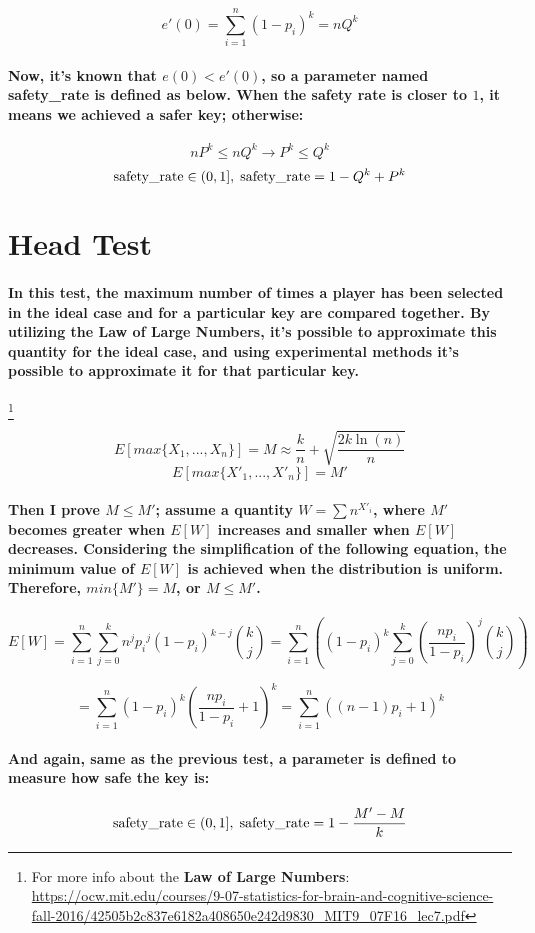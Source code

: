 \documentclass[oneside]{book}
\newcommand{\myparagraph}[1]{\paragraph{\textnormal{#1}}}
\begin{document}
$$e'(0) = \sum_{i=1}^{n} (1 - p_i)^k = n Q^k$$

\myparagraph{
Now, it's known that $e(0) < e'(0)$, so a parameter named safety\_rate is defined as below. When the safety rate is closer to $1$, it means we achieved a safer key; otherwise:
}

$$nP^k \le nQ^k \rightarrow P^k \le Q^k$$
$$\textnormal{safety\_rate} \in (0, 1], \; \textnormal{safety\_rate} = 1-Q^k+P^k$$

\section{Head Test}

\myparagraph{
In this test, the maximum number of times a player has been selected in the ideal case and for a particular key are compared together. By utilizing the \textbf{Law of Large Numbers}, it's possible to approximate this quantity for the ideal case, and using experimental methods it's possible to approximate it for that particular key.
}
\footnote{
For more info about the \textbf{Law of Large Numbers}:\newline
\href{https://ocw.mit.edu/courses/9-07-statistics-for-brain-and-cognitive-science-fall-2016/42505b2c837e6182a408650e242d9830_MIT9_07F16_lec7.pdf}{https://ocw.mit.edu/courses/9-07-statistics-for-brain-and-cognitive-science-fall-2016/42505b2c837e6182a408650e242d9830\_MIT9\_07F16\_lec7.pdf}
}

$$E[max\{X_1, ..., X_n\}] = M \approx  \frac{k}{n} + \sqrt{\frac{2k \ln(n)}{n}}$$
$$E[max\{X'_1, ..., X'_n\}] = M'$$

\myparagraph{
Then I prove $M \le M'$; assume a quantity $W=\sum n^{X'_i}$, where $M'$ becomes greater when $E[W]$ increases and smaller when $E[W]$ decreases. Considering the simplification of the following equation, the minimum value of $E[W]$ is achieved when the distribution is uniform. Therefore, $min\{M'\}=M$, or $M \le M'$.
}

$$E[W] = \sum_{i=1}^n \sum_{j=0}^k n^j {p_i}^j (1-p_i)^{k-j} \binom{k}{j} = \sum_{i=1}^n \left( (1-p_i)^k \sum_{j=0}^k \left( \frac{np_i}{1-p_i} \right)^j \binom{k}{j} \right)$$

$$= \sum_{i=1}^n (1-p_i)^k \left( \frac{np_i}{1-p_i} + 1 \right)^k = \sum_{i=1}^n ((n-1)p_i + 1)^k$$

\myparagraph{
 And again, same as the previous test, a parameter is defined to measure how safe the key is:
}

$$\textnormal{safety\_rate} \in (0, 1], \; \textnormal{safety\_rate} = 1 - \frac{M' - M}{k}$$
\end{document}
